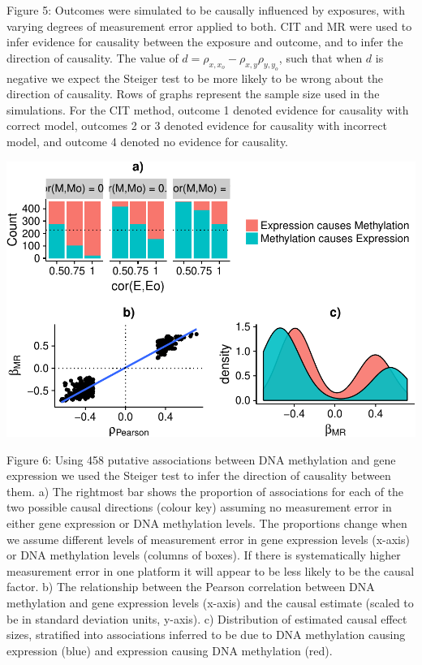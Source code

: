 \documentclass[]{article}
\begin{document}
Figure 5: Outcomes were simulated to be causally influenced by
exposures, with varying degrees of measurement error applied to both.
CIT and MR were used to infer evidence for causality between the
exposure and outcome, and to infer the direction of causality. The value
of \(d = \rho_{x, x_o} - \rho_{x,y}\rho_{y,y_o}\), such that when \(d\)
is negative we expect the Steiger test to be more likely to be wrong
about the direction of causality. Rows of graphs represent the sample
size used in the simulations. For the CIT method, outcome 1 denoted
evidence for causality with correct model, outcomes 2 or 3 denoted
evidence for causality with incorrect model, and outcome 4 denoted no
evidence for causality.

\newpage

\includegraphics{manuscript_files/figure-latex/shakhplot-1.pdf}

Figure 6: Using 458 putative associations between DNA methylation and
gene expression we used the Steiger test to infer the direction of
causality between them. a) The rightmost bar shows the proportion of
associations for each of the two possible causal directions (colour key)
assuming no measurement error in either gene expression or DNA
methylation levels. The proportions change when we assume different
levels of measurement error in gene expression levels (x-axis) or DNA
methylation levels (columns of boxes). If there is systematically higher
measurement error in one platform it will appear to be less likely to be
the causal factor. b) The relationship between the Pearson correlation
between DNA methylation and gene expression levels (x-axis) and the
causal estimate (scaled to be in standard deviation units, y-axis). c)
Distribution of estimated causal effect sizes, stratified into
associations inferred to be due to DNA methylation causing expression
(blue) and expression causing DNA methylation (red).
\end{document}
